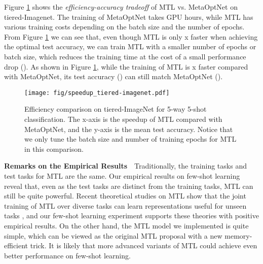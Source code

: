 \documentclass{article}
\begin{document}
Figure \ref{fig:speedup-tiered-imagenet} shows the \textit{efficiency-accuracy tradeoff} of MTL vs. MetaOptNet on tiered-Imagenet. The training of MetaOptNet takes  GPU hours, while MTL has various training costs depending on the batch size and the number of epochs. From Figure \ref{fig:speedup-tiered-imagenet} we can see that, even though MTL is only x faster when achieving the optimal test accuracy, we can train MTL with a smaller number of epochs or batch size, which reduces the training time at the cost of a small performance drop (). As shown in Figure \ref{fig:speedup-tiered-imagenet}, while the training of MTL is x faster compared with MetaOptNet, its test accuracy () can still match MetaOptNet ().
\begin{figure}[t!]
    \centering
    \texttt{[image: fig/speedup\_tiered-imagenet.pdf]}
    \vspace{-0.7em}
    \caption{Efficiency comparison on tiered-ImageNet for 5-way 5-shot classification. The x-axis is the speedup of MTL compared with MetaOptNet, and the y-axis is the mean test accuracy. Notice that we only tune the batch size and number of training epochs for MTL in this comparison.}
    \label{fig:speedup-tiered-imagenet}
    \vspace{-1em}
\end{figure}


\textbf{Remarks on the Empirical Results}~~Traditionally, the training tasks and test tasks for MTL are the same. Our empirical results on few-shot learning reveal that, even as the test tasks are distinct from the training tasks, MTL can still be quite powerful. Recent theoretical studies on MTL show that the joint training of MTL over diverse tasks can learn representations useful for unseen tasks \citep{tripuraneni2020theory,du2021fewshot}, and our few-shot learning experiment supports these theories with positive empirical results. On the other hand, the MTL model we implemented is quite simple, which can be viewed as the original MTL proposal \citep{caruana1997multitask} with a new memory-efficient trick. It is likely that more advanced variants of MTL could achieve even better performance on few-shot learning.
\vspace{-0.5em}
\end{document}
